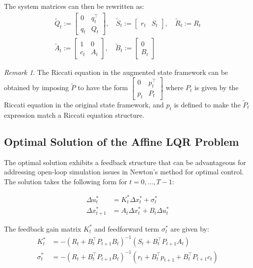 \documentclass[openany]{book}
\theoremstyle{definition}
\theoremstyle{remark}
\newtheorem*{remark}{Remark}
\begin{document}
The system matrices can then be rewritten as:
\begin{gather*}
    \tilde{Q}_t := \begin{bmatrix} 0 & q_t^\top \\ q_t & Q_t \end{bmatrix}, \quad
    \tilde{S}_t := \begin{bmatrix} r_t & S_t \end{bmatrix}, \quad
    \tilde{R}_t := R_t\\
    \tilde{A}_t := \begin{bmatrix} 1 & 0 \\ c_t & A_t \end{bmatrix}, \quad
    \tilde{B}_t := \begin{bmatrix} 0 \\ B_t \end{bmatrix}
\end{gather*}

\begin{remark}
The Riccati equation in the augmented state framework can be obtained by imposing $\tilde{P}$ to have the form $\begin{bmatrix} 0 & p_t^\top \\ p_t & P_t \end{bmatrix}$ where $P_t$ is given by the Riccati equation in the original state framework, and $p_t$ is defined to make the $\tilde{P}_t$ expression match a Riccati equation structure.
\end{remark}

\subsection{Optimal Solution of the Affine LQR Problem}

The optimal solution exhibits a feedback structure that can be advantageous for addressing open-loop simulation issues in Newton's method for optimal control. The solution takes the following form for $t = 0,\ldots,T-1$:

\begin{align*}
    \Delta u_t^* &= K_t^*\Delta x_t^* + \sigma_t^* \\
    \Delta x_{t+1}^* &= A_t\Delta x_t^* + B_t\Delta u_t^*
\end{align*}

The feedback gain matrix $K_t^*$ and feedforward term $\sigma_t^*$ are given by:
\begin{align*}
    K_t^* &= -(R_t + B_t^\top P_{t+1}B_t)^{-1}(S_t + B_t^\top P_{t+1}A_t) \\
    \sigma_t^* &= -(R_t + B_t^\top P_{t+1}B_t)^{-1}(r_t + B_t^\top p_{t+1} + B_t^\top P_{t+1}c_t)
\end{align*}
\end{document}
